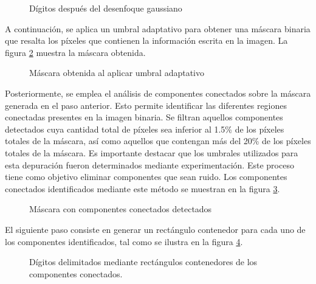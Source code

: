 \begin{figure}[H]
    \centering
    \caption[Dígitos después del desenfoque gaussiano]{Dígitos después del desenfoque gaussiano}
    \label{fig:etl-4-votos-desenfocado}
\end{figure}

A continuación, se aplica un umbral adaptativo para obtener una máscara binaria que resalta los píxeles que contienen
la información escrita en la imagen. La figura \ref{fig:etl-4-votos-mascara} muestra la máscara obtenida.

\begin{figure}[H]
    \centering
    \caption[Máscara obtenida al aplicar umbral adaptativo]{Máscara obtenida al aplicar umbral adaptativo}
    \label{fig:etl-4-votos-mascara}
\end{figure}

Posteriormente, se emplea el análisis de componentes conectados \parencite{bolelli2019spaghetti} sobre la máscara generada en el paso anterior. Esto permite identificar las diferentes
regiones conectadas presentes en la imagen binaria. Se filtran aquellos componentes detectados cuya cantidad total de
píxeles sea inferior al 1.5\% de los píxeles totales de la máscara, así como aquellos que contengan más del 20\% de los
píxeles totales de la máscara. Es importante destacar que los umbrales utilizados para esta depuración fueron
determinados mediante experimentación. Este proceso tiene como objetivo eliminar componentes que sean ruido. Los
componentes conectados identificados mediante este método se muestran en la figura \ref{fig:etl-4-votos-cc}.

\begin{figure}[H]
    \centering
    \caption[Máscara con componentes conectados detectados]{Máscara con componentes conectados detectados}
    \label{fig:etl-4-votos-cc}
\end{figure}

El siguiente paso consiste en generar un rectángulo contenedor para cada uno de los componentes identificados, tal como
se ilustra en la figura \ref{fig:etl-4-votos-bounding-boxes}.

\begin{figure}[H]
    \centering
    \caption[Dígitos delimitados]{Dígitos delimitados mediante rectángulos contenedores de los componentes conectados.}
    \label{fig:etl-4-votos-bounding-boxes}
\end{figure}

